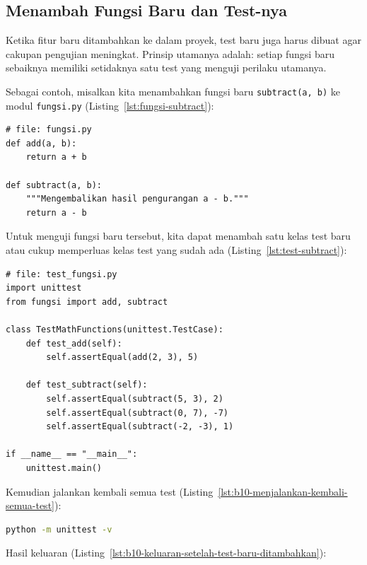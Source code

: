 \subsection{Menambah Fungsi Baru dan Test-nya}

Ketika fitur baru ditambahkan ke dalam proyek, test baru juga harus dibuat agar cakupan pengujian meningkat.  
Prinsip utamanya adalah: setiap fungsi baru sebaiknya memiliki setidaknya satu test yang menguji perilaku utamanya.

Sebagai contoh, misalkan kita menambahkan fungsi baru \texttt{subtract(a, b)} ke modul \texttt{fungsi.py} (Listing~\ref{lst:fungsi-subtract}):

\begin{lstlisting}[style=PythonStyle, caption={Menambahkan fungsi baru}, label={lst:fungsi-subtract}]
# file: fungsi.py
def add(a, b):
    return a + b

def subtract(a, b):
    """Mengembalikan hasil pengurangan a - b."""
    return a - b
\end{lstlisting}

Untuk menguji fungsi baru tersebut, kita dapat menambah satu kelas test baru atau cukup memperluas kelas test yang sudah ada (Listing~\ref{lst:test-subtract}):

\begin{lstlisting}[style=PythonStyle, caption={Menambahkan test untuk fungsi baru}, label={lst:test-subtract}]
# file: test_fungsi.py
import unittest
from fungsi import add, subtract

class TestMathFunctions(unittest.TestCase):
    def test_add(self):
        self.assertEqual(add(2, 3), 5)

    def test_subtract(self):
        self.assertEqual(subtract(5, 3), 2)
        self.assertEqual(subtract(0, 7), -7)
        self.assertEqual(subtract(-2, -3), 1)

if __name__ == "__main__":
    unittest.main()
\end{lstlisting}

Kemudian jalankan kembali semua test (Listing~\ref{lst:b10-menjalankan-kembali-semua-test}):

\begin{lstlisting}[language=bash, caption={Menjalankan kembali semua test}, label={lst:b10-menjalankan-kembali-semua-test}]
python -m unittest -v
\end{lstlisting}

Hasil keluaran (Listing~\ref{lst:b10-keluaran-setelah-test-baru-ditambahkan}):

